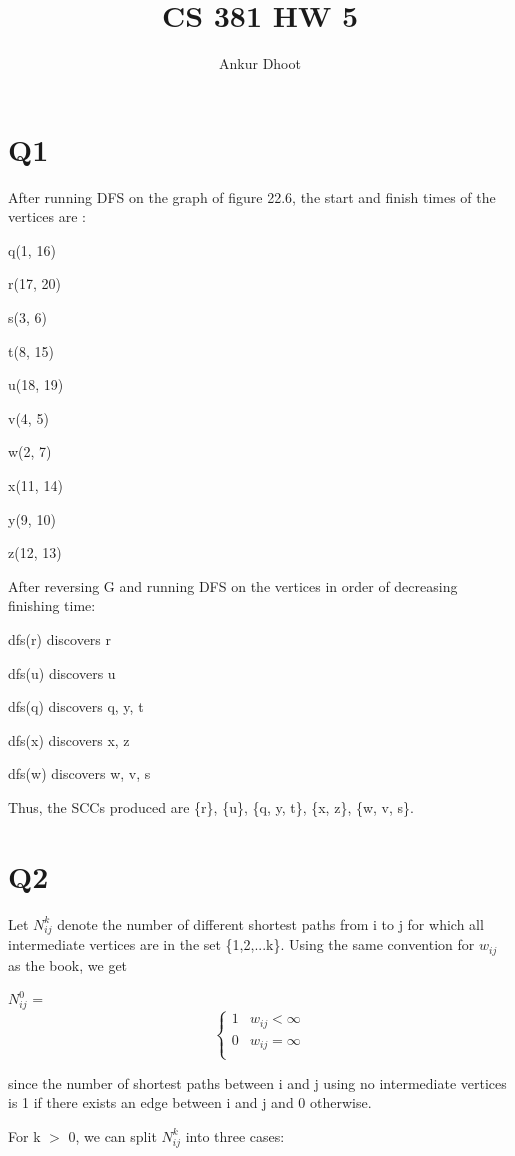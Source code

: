 \documentclass[11pt,a4paper]{article}
\begin{document}
\author{Ankur Dhoot}
\title{CS 381 HW 5}
\maketitle

\section*{Q1}
After running DFS on the graph of figure 22.6, the start and finish times of the vertices are :

q(1, 16)

r(17, 20)

s(3, 6)

t(8, 15)

u(18, 19)

v(4, 5)

w(2, 7)

x(11, 14)

y(9, 10)

z(12, 13)

After reversing G and running DFS on the vertices in order of decreasing finishing time:

dfs(r) discovers r

dfs(u) discovers u

dfs(q) discovers q, y, t

dfs(x) discovers x, z

dfs(w) discovers w, v, s

Thus, the SCCs produced are \{r\}, \{u\}, \{q, y, t\}, \{x, z\}, \{w, v, s\}.

\section*{Q2}

Let $N_{ij}^{k}$ denote the number of different shortest paths from i to j for which all intermediate vertices are in the set \{1,2,...k\}. Using the same convention for $w_{ij}$ as the book, we get

$N_{ij}^{0}$ =  
\[ \begin{cases} 
      1 & w_{ij} < \infty \\
      0 & w_{ij} = \infty \\
   \end{cases}
\]

since the number of shortest paths between i and j using no intermediate vertices is 1 if there exists an edge between i and j and 0 otherwise.

For k $>$ 0, we can split $N_{ij}^{k}$ into three cases:
\end{document}
